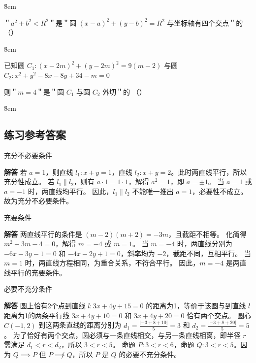 \v{8em}

\begin{example}
    ＂$a^2+b^2<R^2$＂是＂圆 $(x-a)^2+(y-b)^2=R^2$ 与坐标轴有四个交点＂的 （\qquad）
\end{example}

\v{8em}

\begin{example}
    已知圆 $C_1:(x-2 m)^2+(y-2 m)^2=9(m-2)$ 与圆 $C_2: x^2+y^2-8 x-8 y+34-m=0$

    则＂$m=4$＂是＂圆 $C_1$ 与圆 $C_2$ 外切＂的 （\qquad）
\end{example}

\v{8em}

\subsection{练习参考答案}

\begin{solution}
    充分不必要条件

    \textbf{解答}
    若 $a=1$，则直线 $l_1: x+y=1$，直线 $l_2: x+y=2$。此时两直线平行，所以充分性成立。
    若 $l_1 \parallel l_2$，则有 $a \cdot 1 = 1 \cdot 1$，解得 $a^2=1$，即 $a = \pm 1$。  当 $a=1$ 或 $a=-1$ 时，两直线均平行。  因此，$l_1 \parallel l_2$ 不能唯一推出 $a=1$，必要性不成立。
    故为充分不必要条件。
\end{solution}

\begin{solution}
    充要条件

    \textbf{解答}
    两直线平行的条件是 $(m-2)(m+2) = -3m$，且截距不相等。
    化简得 $m^2+3m-4=0$，解得 $m=-4$ 或 $m=1$。
    当 $m=-4$ 时，两直线分别为 $-6x-3y-1=0$ 和 $-4x-2y+1=0$，斜率均为 $-2$，截距不同，互相平行。
    当 $m=1$ 时，两直线方程相同，为重合关系，不符合平行。
    因此，$m=-4$ 是两直线平行的充要条件。
\end{solution}

\begin{solution}
    必要不充分条件

    \textbf{解答}
    圆上恰有2个点到直线 $l:3x+4y+15=0$ 的距离为1，等价于该圆与到直线 $l$ 距离为1的两条平行线 $3x+4y+10=0$ 和 $3x+4y+20=0$ 恰有两个交点。
    圆心 $C(-1, 2)$ 到这两条直线的距离分别为 $d_1 = \frac{|-3+8+10|}{5}=3$ 和 $d_2 = \frac{|-3+8+20|}{5}=5$。
    为了恰好有两个交点，圆必须与一条直线相交，与另一条直线相离，即半径 $r$ 需满足 $d_1 < r < d_2$，所以 $3 < r < 5$。
    命题 $P: 3 < r < 6$，命题 $Q: 3 < r < 5$。因为 $Q \implies P$ 但 $P \not\implies Q$，所以 $P$ 是 $Q$ 的必要不充分条件。
\end{solution}

